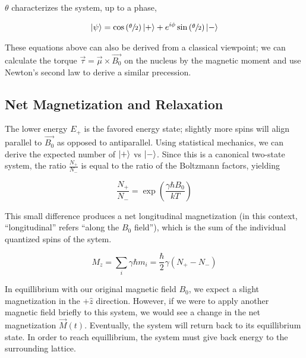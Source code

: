 \documentclass[
    floatfix,  %
    reprint,
    amsmath,
    amssymb,
    aps,
]{revtex4-2}
\DeclarePairedDelimiter\ket{\lvert}{\rangle}
\begin{document}
$\theta$ characterizes the system, up to a phase,

\begin{gather*}
    \ket{\psi} = \cos\left(\sfrac{\theta}{2}\right)\ket{+}+ e^{i\phi}\sin\left(\sfrac{\theta}{2}\right) \ket{-}
\end{gather*}

These equations above can also be derived from a classical viewpoint; we can calculate the torque $\vec{\tau}  =\vec{ \mu }\times \vec{B_0}$ on the nucleus by the magnetic moment and use Newton's second law to derive a similar precession.











\subsection{\label{subsec:pulses} Net Magnetization and Relaxation}

The lower energy $E_+$ is the favored energy state; slightly more spins will align parallel to $\vec{B_0}$ as opposed to antiparallel. Using statistical mechanics, we can derive the expected number of $\ket{+}$ vs $\ket{-}$. Since this is a canonical two-state system, the ratio $\frac{N_+}{N_-}$ is equal to the ratio of the Boltzmann factors, yielding

\begin{equation}
    \frac{N_+}{N_-} = \exp\left(\frac{\gamma \hbar B_0}{k T}\right)
\end{equation}

This small difference produces a net longitudinal magnetization (in this context, ``longitudinal'' refers ``along the $B_0$ field''), which is the sum of the individual quantized spins of the sytem. \cite{lab-manual}

\begin{equation}
    M_z = \sum_i \gamma \hbar m_i = \frac{\hbar}{2} \gamma (N_+ - N_-)
\end{equation}

In equillibrium with our original magnetic field $B_0$, we expect a slight magnetization in the $+\hat{z}$ direction. However, if we were to apply another magnetic field briefly to this system, we would see a change in the net magnetization $\vec{M}(t)$. Eventually, the system will return back to its equillibrium state. In order to reach equillibrium, the system must give back energy to the surrounding lattice.
\end{document}
